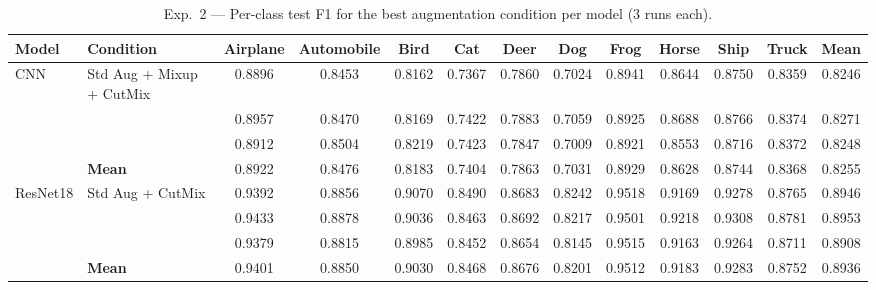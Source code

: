 \begin{table}[H]
\centering
\caption{Exp.\ 2 — Per-class test F1 for the best augmentation condition per model (3 runs each).}
\label{tab:exp2_perclass}
\small
\begin{tabular}{llccccccccccc}
\toprule
\textbf{Model} & \textbf{Condition} & \textbf{Airplane} & \textbf{Automobile} & \textbf{Bird} & \textbf{Cat} & \textbf{Deer} & \textbf{Dog} & \textbf{Frog} & \textbf{Horse} & \textbf{Ship} & \textbf{Truck} & \textbf{Mean} \\
\midrule
CNN & Std Aug + Mixup + CutMix & 0.8896 & 0.8453 & 0.8162 & 0.7367 & 0.7860 & 0.7024 & 0.8941 & 0.8644 & 0.8750 & 0.8359 & 0.8246 \\
 &  & 0.8957 & 0.8470 & 0.8169 & 0.7422 & 0.7883 & 0.7059 & 0.8925 & 0.8688 & 0.8766 & 0.8374 & 0.8271 \\
 &  & 0.8912 & 0.8504 & 0.8219 & 0.7423 & 0.7847 & 0.7009 & 0.8921 & 0.8553 & 0.8716 & 0.8372 & 0.8248 \\
 & \textbf{Mean} & 0.8922 & 0.8476 & 0.8183 & 0.7404 & 0.7863 & 0.7031 & 0.8929 & 0.8628 & 0.8744 & 0.8368 & 0.8255 \\
\midrule
ResNet18 & Std Aug + CutMix & 0.9392 & 0.8856 & 0.9070 & 0.8490 & 0.8683 & 0.8242 & 0.9518 & 0.9169 & 0.9278 & 0.8765 & 0.8946 \\
 &  & 0.9433 & 0.8878 & 0.9036 & 0.8463 & 0.8692 & 0.8217 & 0.9501 & 0.9218 & 0.9308 & 0.8781 & 0.8953 \\
 &  & 0.9379 & 0.8815 & 0.8985 & 0.8452 & 0.8654 & 0.8145 & 0.9515 & 0.9163 & 0.9264 & 0.8711 & 0.8908 \\
 & \textbf{Mean} & 0.9401 & 0.8850 & 0.9030 & 0.8468 & 0.8676 & 0.8201 & 0.9512 & 0.9183 & 0.9283 & 0.8752 & 0.8936 \\
\midrule
\bottomrule
\end{tabular}
\end{table}
